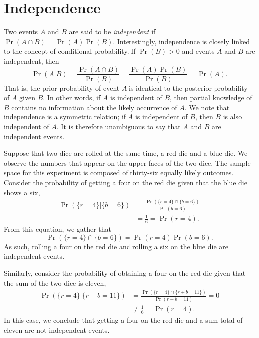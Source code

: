 \section{Independence}
\label{section:Independence}

Two events $A$ and $B$ are said to be \emph{independent} if $\Pr (A \cap B) = \Pr(A) \Pr(B)$. 
Interestingly, independence is closely linked to the concept of conditional probability.
If $\Pr(B) > 0$ and events $A$ and $B$ are independent, then
\begin{equation*}
\Pr (A | B) = \frac{ \Pr (A \cap B) }{\Pr (B)}
= \frac{ \Pr (A) \Pr(B) }{\Pr (B)}
= \Pr (A).
\end{equation*}
That is, the prior probability of event $A$ is identical to the posterior probability of $A$ given $B$.
In other words, if $A$ is independent of $B$, then partial knowledge of $B$ contains no information about the likely occurrence of $A$.
We note that independence is a symmetric relation; if $A$ is independent of $B$, then $B$ is also independent of $A$.
It is therefore unambiguous to say that $A$ and $B$ are independent events.

\begin{example}
Suppose that two dice are rolled at the same time, a red die and a blue die.
We observe the numbers that appear on the upper faces of the two dice.
The sample space for this experiment is composed of thirty-six equally likely outcomes.
Consider the probability of getting a four on the red die given that the blue die shows a six,
\begin{equation*}
\begin{split}
\Pr (\{ r=4 \} | \{ b=6 \})
&= \frac{ \Pr (\{ r=4 \} \cap \{ b=6 \}) }
{ \Pr ( b=6 ) } \\
&= \frac{1}{6} = \Pr ( r=4 ) .
\end{split}
\end{equation*}
From this equation, we gather that
\begin{equation*}
\Pr (\{ r=4 \} \cap \{ b=6 \})
= \Pr ( r=4 ) \Pr ( b=6 ) .
\end{equation*}
As such, rolling a four on the red die and rolling a six on the blue die are independent events.

Similarly, consider the probability of obtaining a four on the red die given that the sum of the two dice is eleven,
\begin{equation*}
\begin{split}
\Pr (\{ r=4 \} | \{ r+b=11 \})
&= \frac{ \Pr (\{ r=4 \} \cap \{ r+b=11 \}) }
{ \Pr ( r+b=11 ) } = 0 \\
&\neq \frac{1}{6} = \Pr ( r=4 ) .
\end{split}
\end{equation*}
In this case, we conclude that getting a four on the red die and a sum total of eleven are not independent events.
\end{example}

